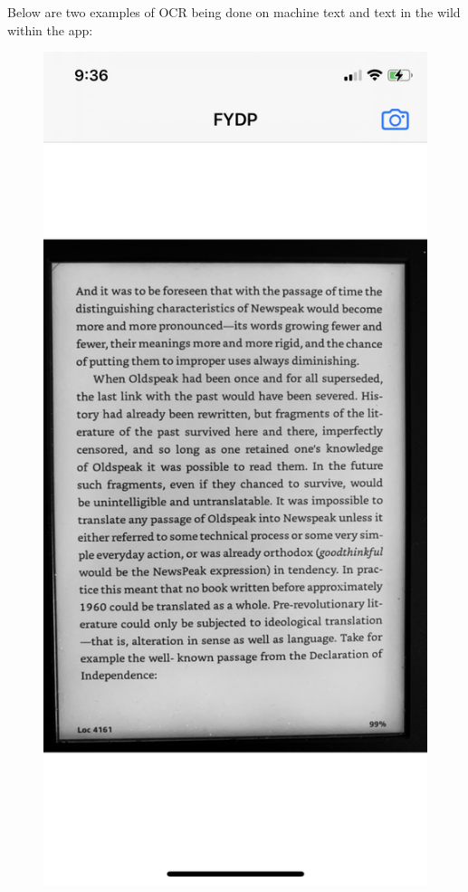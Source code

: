 \documentclass[a4paper,11pt]{article}
\begin{document}
\newpage
\noindent
Below are two examples of OCR being done on machine text and text in the wild within the app:

\begin{figure}[H]
    \centering
    \includegraphics[width={0.25\linewidth}]{img/ios_test_app/testapp_kindle.jpeg}

\end{figure}
\end{document}
